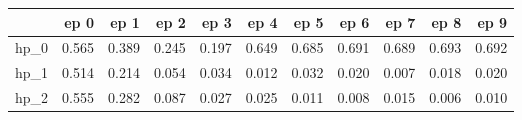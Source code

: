 \begin{tabular}{lrrrrrrrrrr}
\toprule
{} &   ep 0 &   ep 1 &   ep 2 &   ep 3 &   ep 4 &   ep 5 &   ep 6 &   ep 7 &   ep 8 &   ep 9 \\
\midrule
hp\_0 &  0.565 &  0.389 &  0.245 &  0.197 &  0.649 &  0.685 &  0.691 &  0.689 &  0.693 &  0.692 \\
hp\_1 &  0.514 &  0.214 &  0.054 &  0.034 &  0.012 &  0.032 &  0.020 &  0.007 &  0.018 &  0.020 \\
hp\_2 &  0.555 &  0.282 &  0.087 &  0.027 &  0.025 &  0.011 &  0.008 &  0.015 &  0.006 &  0.010 \\
\bottomrule
\end{tabular}
